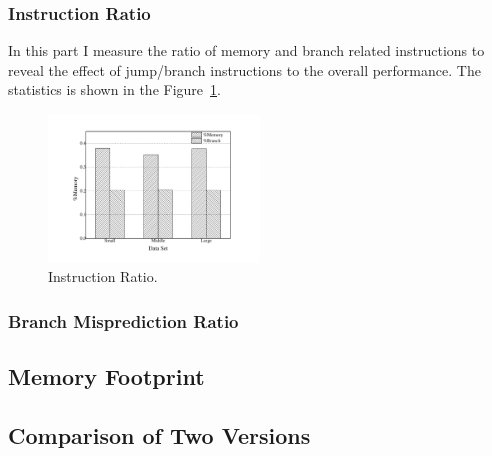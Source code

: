\subsubsection{Instruction Ratio}
In this part I measure the ratio of memory and branch related instructions to reveal the effect of jump/branch instructions to the overall performance. The statistics is shown in the Figure~\ref{fig:ratio}.
\begin{figure}
\centering
\includegraphics[width=0.50\textwidth]{graph/ins_ratio.pdf}
\caption{Instruction Ratio.}
\label{fig:ratio}
\end{figure}
\subsubsection{Branch Misprediction Ratio }
\subsection{Memory Footprint}
\label{sec:memory}
\subsection{Comparison of Two Versions}
\label{sec:comparison} 
